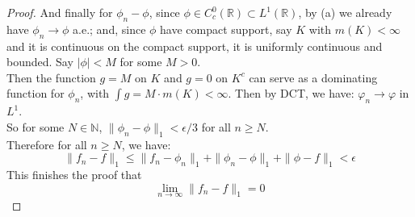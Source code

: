 \documentclass[lang=cn,11pt]{elegantbook}
\begin{document}
\begin{proof}
And finally for $\phi_n - \phi$, since \( \phi  \in C_c^0(\mathbb{R})  \subset L^1(\mathbb{R})\), by (a) we already have \( \phi_n \to \phi \) a.e.; and, since $\phi$ have compact support, say $K$ with $m(K) < \infty$ and it is continuous on the compact support, it is uniformly continuous and bounded. Say $|\phi| < M$ for some $M > 0$.\\
Then the function $g = M$ on $K$ and $g = 0$ on $K^c$ can serve as a dominating function for $\phi_n$, with $\int g = M\cdot m(K) < \infty$. Then by DCT, we have: \( \varphi_n \to \varphi \) in \( L^1 \). \\
So for some \( N \in \mathbb{N}\), \(\|\phi_n - \phi\|_1 < \epsilon/3\) for all $n \geq N$.\\
Therefore for all $n\geq N$, we have: \[
\|f_n - f\|_1 \le \|f_n - \phi_n\|_1 + \|\phi_n - \phi\|_1 + \|\phi - f\|_1  < \epsilon
\]
This finishes the proof that
\[
\lim_{n \to \infty} \|f_n - f\|_1 = 0
\]
\end{proof}
\end{document}
